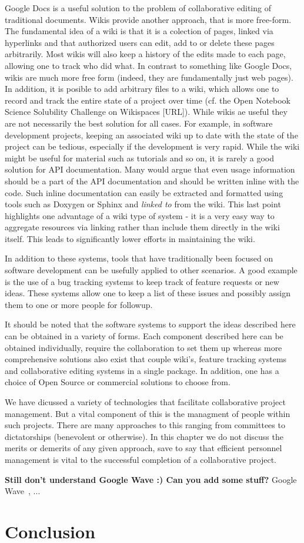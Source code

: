 \documentclass[12pt]{book}
\begin{document}
Google Docs is a useful solution to the problem of collaborative
editing of traditional documents. Wikis provide another approach, that
is more free-form. The fundamental idea of a wiki is that it is a
colection of pages, linked via hyperlinks and that authorized users
can edit, add to or delete these pages arbitrarily. Most wikis will
also keep a history of the edits made to each page, allowing one to
track who did what. In contrast to something like Google Docs, wikis
are much more free form (indeed, they are fundamentally just web
pages). In addition, it is posible to add arbitrary files to a wiki,
which allows one to record and track the entire state of a project
over time (cf. the Open Notebook Science Solubility Challenge on
Wikispaces [URL]). While wikis ae useful they are not necessarily the
best solution for all cases. For example, in software development
projects, keeping an associated wiki up to date with the state of the
project can be tedious, especially if the development is very
rapid. While the wiki might be useful for material such as tutorials
and so on, it is rarely a good solution for API documentation. Many
would argue that even usage information should be a part of the API
documentation and should be written inline with the code. Such inline
documentation can easily be extracted and formatted using tools such
as Doxygen or Sphinx and \emph{linked to} from the wiki. This last
point highlights one advantage of a wiki type of system - it is a very
easy way to aggregate resources via linking rather than include them
directly in the wiki itself. This leads to significantly lower efforts
in maintaining the wiki.

In addition to these systems, tools that have traditionally been
focused on software development can be usefully applied to other
scenarios. A good example is the use of a bug tracking systems to keep
track of feature requests or new ideas. These systems allow one to
keep a list of these issues and possibly assign them to one or more
people for followup.

It should be noted that the software systems to support the ideas
described here can be obtained in a variety of forms. Each component
described here can be obtained individually, require the collaboration
to set them up whereas more comprehensive solutions also exist that
couple wiki's, feature tracking systems and collaborative editing
systems in a single package. In addition, one has a choice of Open
Source or commercial solutions to choose from.

We have dicussed a variety of technologies that facilitate
collaborative project management. But a vital component of this is the
managment of people within such projects. There are many approaches to
this ranging from committees to dictatorships (benevolent or
otherwise). In this chapter we do not discuss the merits or demerits
of any given approach, save to say that efficient personnel management
is vital to the successful completion of a collaborative project.

\textbf{Still don't understand Google Wave :) Can you add some stuff?}
Google Wave~\cite{Neylon2009}, ...

\section{Conclusion}



\end{document}
